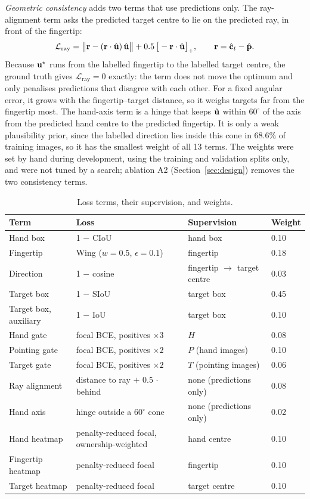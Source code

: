 \emph{Geometric consistency} adds two terms that use predictions only. The ray-alignment term asks the predicted target centre to lie on the predicted ray, in front of the fingertip:
\begin{equation}
\mathcal{L}_{\mathrm{ray}} = \big\|\mathbf{r}-(\mathbf{r}\cdot\hat{\mathbf{u}})\,\hat{\mathbf{u}}\big\| + 0.5\,\big[-\mathbf{r}\cdot\hat{\mathbf{u}}\big]_+,\qquad \mathbf{r}=\hat{\mathbf{c}}_t-\hat{\mathbf{p}}.
\label{eq:rayloss}
\end{equation}
Because $\mathbf{u}^\star$ runs from the labelled fingertip to the labelled target centre, the ground truth gives $\mathcal{L}_{\mathrm{ray}}=0$ exactly: the term does not move the optimum and only penalises predictions that disagree with each other. For a fixed angular error, it grows with the fingertip--target distance, so it weighs targets far from the fingertip most. The hand-axis term is a hinge that keeps $\hat{\mathbf{u}}$ within $60^\circ$ of the axis from the predicted hand centre to the predicted fingertip. It is only a weak plausibility prior, since the labelled direction lies inside this cone in 68.6\% of training images, so it has the smallest weight of all 13 terms. The weights were set by hand during development, using the training and validation splits only, and were not tuned by a search; ablation A2 (Section~\ref{sec:design}) removes the two consistency terms.

\begin{table}[t]
  \caption{Loss terms, their supervision, and weights.}
  \label{tab:weights}
  \footnotesize
  \begin{tabular}{llll}
    \toprule
    Term & Loss & Supervision & Weight \\
    \midrule
    Hand box & 1 $-$ CIoU & hand box & 0.10 \\
    Fingertip & Wing ($w{=}0.5$, $\epsilon{=}0.1$) & fingertip & 0.18 \\
    Direction & 1 $-$ cosine & fingertip $\to$ target centre & 0.03 \\
    Target box & 1 $-$ SIoU & target box & 0.45 \\
    Target box, auxiliary & 1 $-$ IoU & target box & 0.10 \\
    Hand gate & focal BCE, positives $\times3$ & $H$ & 0.08 \\
    Pointing gate & focal BCE, positives $\times2$ & $P$ (hand images) & 0.10 \\
    Target gate & focal BCE, positives $\times2$ & $T$ (pointing images) & 0.06 \\
    Ray alignment & distance to ray $+$ 0.5 $\cdot$ behind & none (predictions only) & 0.08 \\
    Hand axis & hinge outside a $60^\circ$ cone & none (predictions only) & 0.02 \\
    Hand heatmap & penalty-reduced focal, ownership-weighted & hand centre & 0.10 \\
    Fingertip heatmap & penalty-reduced focal & fingertip & 0.10 \\
    Target heatmap & penalty-reduced focal & target centre & 0.10 \\
    \bottomrule
  \end{tabular}
\end{table}

